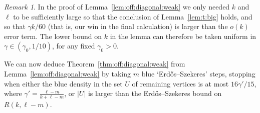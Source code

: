 \documentclass[12pt,reqno]{amsart}
\theoremstyle{definition}
\theoremstyle{remark}
\newtheorem{remark}[theorem]{Remark}
\begin{document}
\begin{remark}\label{rmk:uniform:gamma}
In the proof of Lemma~\ref{lem:off:diagonal:weak} we only needed $k$ and $\ell$ to be sufficiently large so that the conclusion of Lemma~\ref{lem:t:big} holds, and so that $\gamma k / 60$ (that is, our win in the final calculation) is larger than the $o(k)$ error term. The lower bound on $k$ in the lemma can therefore be taken uniform in $\gamma \in (\gamma_0,1/10)$, for any fixed $\gamma_0 > 0$. 
\end{remark}

\pagebreak

We can now deduce Theorem~\ref{thm:off:diagonal:weak} from Lemma~\ref{lem:off:diagonal:weak} by taking $m$ blue `Erd\H{o}s--Szekeres' steps, stopping when either the blue density in the set $U$ of remaining vertices is at most $16\gamma'/15$, where $\gamma' = \frac{\ell-m}{k+\ell-m}$, or $|U|$ is larger than the Erd\H{o}s--Szekeres bound on $R(k,\ell-m)$.
\end{document}
